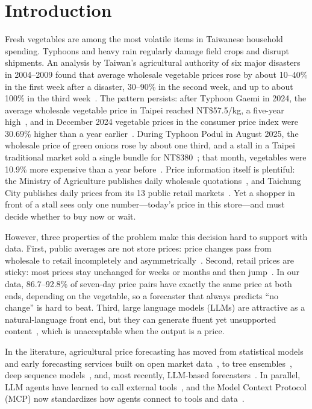 \section{Introduction}\label{sec:intro}

Fresh vegetables are among the most volatile items in Taiwanese household
spending. Typhoons and heavy rain regularly damage field crops and disrupt
shipments. An analysis by Taiwan's agricultural authority of six major
disasters in 2004--2009 found that average wholesale vegetable prices rose by
about 10--40\% in the first week after a disaster, 30--90\% in the second
week, and up to about 100\% in the third week~\cite{coa2010typhoon}. The
pattern persists: after Typhoon Gaemi in 2024, the average wholesale vegetable price
in Taipei reached NT\$57.5/kg, a five-year high~\cite{taiwannews2024gaemi}, and
in December 2024 vegetable prices in the consumer price index were 30.69\%
higher than a year earlier~\cite{ltn2025cpi}. During Typhoon Podul in August
2025, the wholesale price of green onions rose by about one third, and a stall
in a Taipei traditional market sold a single bundle for
NT\$380~\cite{ltn2025onion,pts2025onion}; that month, vegetables were 10.9\%
more expensive than a year before~\cite{taipeitimes2025cpi}. Price information
itself is plentiful: the Ministry of Agriculture publishes daily wholesale
quotations~\cite{moa2026trans}, and Taichung City publishes daily prices from
its 13 public retail markets~\cite{taichung2026retail}. Yet a shopper in front
of a stall sees only one number---today's price in this store---and must decide
whether to buy now or wait.

However, three properties of the problem make this decision hard to support
with data. First, public averages are not store prices: price changes pass from
wholesale to retail incompletely and
asymmetrically~\cite{ward1982asymmetry,meyer2004asymmetric}. Second, retail
prices are sticky: most prices stay unchanged for weeks or months and then
jump~\cite{bils2004some,nakamura2008five}. In our data, 86.7--92.8\% of
seven-day price pairs have exactly the same price at both ends, depending on
the vegetable, so a forecaster
that always predicts ``no change'' is hard to beat. Third, large language
models (LLMs) are attractive as a natural-language front end, but they can
generate fluent yet unsupported content~\cite{huang2025survey}, which is
unacceptable when the output is a price.

In the literature, agricultural price forecasting has moved from statistical
models and early forecasting services built on open market
data~\cite{peng2015developing}, to tree
ensembles~\cite{breiman2001random,ke2017lightgbm}, deep sequence
models~\cite{zhang2024short}, and, most recently, LLM-based
forecasters~\cite{zhao2025vegetable}. In parallel, LLM agents have learned to
call external tools~\cite{yao2023react,schick2023toolformer}, and the Model
Context Protocol (MCP) now standardizes how agents connect to tools and
data~\cite{anthropic2024mcp}.


